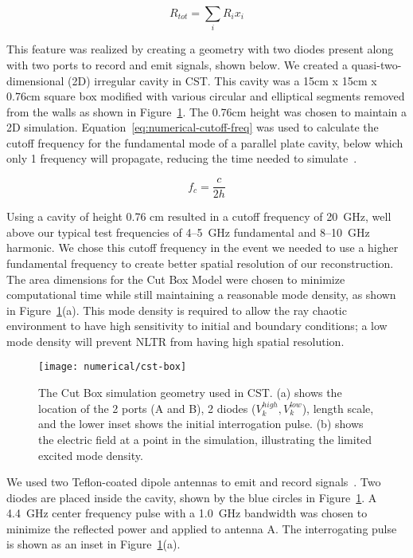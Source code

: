 \begin{equation}
R_{tot} = \sum_{i} R_{i}x_{i}
\label{eq:numerical-r-tot}
\end{equation}

This feature was realized by creating a geometry with two diodes present along with two ports to record and emit signals, shown below. We created a quasi-two-dimensional (2D) irregular cavity in CST. This cavity was a 15cm x 15cm x 0.76cm square box modified with various circular and elliptical segments removed from the walls as shown in Figure~\ref{fig:numerical-cst-box}.  The 0.76cm height was chosen to maintain a 2D simulation. Equation~\ref{eq:numerical-cutoff-freq} was used to calculate the cutoff frequency for the fundamental mode of a parallel plate cavity, below which only 1 frequency will propagate, reducing the time needed to simulate~\cite{griffiths_david_introduction_1999}.

\begin{equation}
f_c = \frac{c}{2h}
\label{eq:numerical-cutoff-freq}
\end{equation}

Using a cavity of height 0.76 cm resulted in a cutoff frequency of 20~GHz, well above our typical test frequencies of \numrange{4}{5}~GHz fundamental and \numrange{8}{10}~GHz harmonic. We chose this cutoff frequency in the event we needed to use a higher fundamental frequency to create better spatial resolution of our reconstruction. The area dimensions for the Cut Box Model were chosen to minimize computational time while still maintaining a reasonable mode density, as shown in Figure~\ref{fig:numerical-cst-box}(a). This mode density is required to allow the ray chaotic environment to have high sensitivity to initial and boundary conditions; a low mode density will prevent NLTR from having high spatial resolution.

\begin{figure}[t]
\centering
\texttt{[image: numerical/cst-box]}
\caption[The Cut Box Model]{The Cut Box simulation geometry used in CST. (a) shows the location of the 2 ports (A and B), 2 diodes ($V_k^{high}, V_k^{low}$), length scale, and the lower inset shows the initial interrogation pulse. (b) shows the electric field at a point in the simulation, illustrating the limited excited mode density.}
\label{fig:numerical-cst-box}
\end{figure}

We used two Teflon-coated dipole antennas to emit and record signals~\cite{hemmady2006universal}. Two diodes are placed inside the cavity, shown by the blue circles in Figure~\ref{fig:numerical-cst-box}. A 4.4~GHz center frequency pulse with a 1.0~GHz bandwidth was chosen to minimize the reflected power and applied to antenna A. The interrogating pulse is shown as an inset in Figure~\ref{fig:numerical-cst-box}(a).

